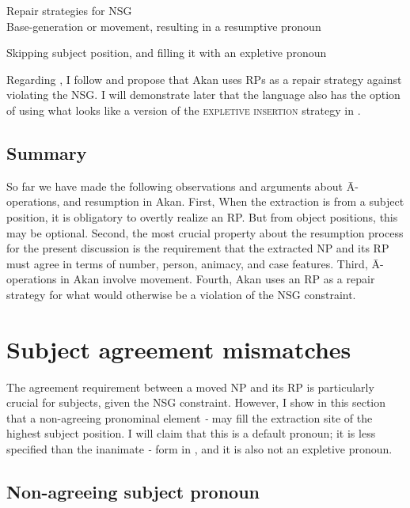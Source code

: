 \documentclass[output=paper]{LSP/langsci}
\begin{document}
  
\ea\label{ex:korsah:14} Repair strategies for NSG \citep[see][]{RnS07} \\
\ea\label{ex:korsah:14a}
Base-generation or movement, resulting in a resumptive pronoun

\ex\label{ex:korsah:14b} 
Skipping subject position, and filling it with an expletive pronoun
\z
\z

Regarding , I follow \cite{Shlonsky92} and propose that Akan uses RPs as a repair strategy against violating the NSG. I will demonstrate later that the language also has the option of using what looks like a version of the \textsc{expletive insertion} strategy in .

  
   
\subsection{Summary}\label{sec:korsah:2.4}

So far we have made the following observations and arguments about \=A-opera\-tions, and resumption in Akan. First, When the extraction is from a subject position,  it is obligatory to  overtly realize an RP. But from object positions, this may be optional. Second, the most crucial property about the resumption process for the present discussion is the requirement that the extracted NP and its RP must agree in terms of number, person, animacy, and case features. Third, \=A-operations in Akan involve movement. Fourth, Akan uses an RP  as a repair strategy for what would otherwise be a violation of the NSG constraint.
   
\section{Subject agreement mismatches}\label{sec:korsah:3}
  
The agreement requirement between a moved NP and its RP is particularly crucial for subjects, given the NSG constraint. However, I show in this section that a non-agreeing pronominal element \textit{\eer-} may fill the extraction site of the highest subject position. I will claim that this is a default pronoun; it is less specified than the inanimate \textit{\eer-} form in , and it is also not an expletive pronoun.
  
\subsection{Non-agreeing subject pronoun}\label{ex:korsah:3.1}
\end{document}
